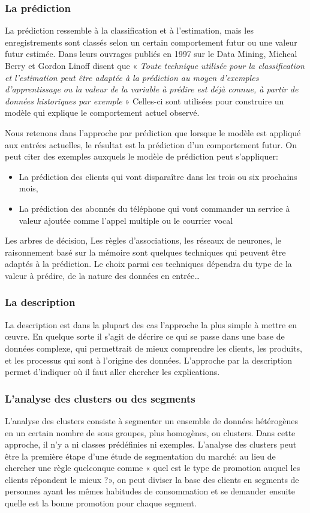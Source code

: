 \documentclass[11pt,a4paper]{report}
\begin{document}
\subsubsection{La prédiction}
La prédiction ressemble à la classification et à l’estimation, mais les enregistrements sont classés selon un certain comportement futur ou une valeur futur estimée.  Dans leurs ouvrages publiés en 1997 sur le Data Mining, Micheal Berry et Gordon Linoff disent que « \textit{Toute technique utilisée pour la classification et l’estimation peut être adaptée à la prédiction au moyen d’exemples d’apprentissage ou la valeur de la variable à prédire est déjà connue, à partir de données historiques par exemple }» Celles-ci sont utilisées pour construire un modèle qui explique le comportement actuel observé. \newline

Nous retenons dans l’approche par prédiction que lorsque le modèle est appliqué aux entrées actuelles, le résultat est la prédiction d’un comportement futur.  On peut citer des exemples auxquels le modèle de prédiction peut s’appliquer: 

\begin{itemize}
\item La prédiction des clients qui vont disparaître dans les trois ou six prochains mois,
\item La prédiction des abonnés du téléphone qui vont commander un service à valeur ajoutée comme l’appel multiple ou le courrier vocal
\end{itemize}
Les arbres de décision, Les règles d’associations, les réseaux de neurones, le raisonnement basé sur la mémoire sont quelques techniques qui peuvent être adaptés à la prédiction. Le choix parmi ces techniques dépendra du type de la valeur à prédire, de la nature des données en entrée…

\subsubsection{La description}
La description est dans la plupart des cas l’approche la plus simple à mettre en œuvre. En quelque sorte il s’agit de décrire ce qui se passe dans une base de données complexe, qui permettrait de mieux comprendre les clients, les produits, et les processus qui sont à l’origine des données. L’approche par la description permet d’indiquer où il faut aller chercher les explications. 

\subsubsection{L'analyse des clusters ou des segments}
L’analyse des clusters consiste à segmenter un ensemble de données hétérogènes en un certain  nombre de sous groupes, plus homogènes, ou clusters. Dans cette approche, il n’y a ni classes prédéfinies ni exemples. L’analyse des clusters peut être la première étape d'une étude de segmentation du marché: au lieu de chercher une règle quelconque comme « quel est le type de promotion auquel les clients répondent le mieux ?», on peut diviser la base des clients en segments de personnes ayant les mêmes habitudes de consommation et se demander ensuite quelle est la bonne promotion pour chaque segment. 
\end{document}
